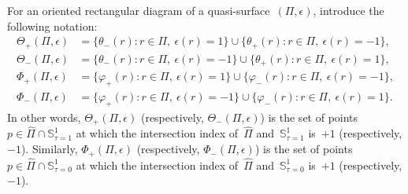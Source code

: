 \documentclass{amsart}
\theoremstyle{theorem}
\theoremstyle{remark}
\theoremstyle{definition}
\numberwithin{equation}{section}
\numberwithin{figure}{section}
\begin{document}
For an oriented rectangular diagram of a quasi-surface~$(\Pi,\epsilon)$, introduce the following notation:
$$\begin{aligned}
\Theta_+(\Pi,\epsilon)&=\{\theta_-(r):r\in\Pi,\ \epsilon(r)=1\}\cup
\{\theta_+(r):r\in\Pi,\ \epsilon(r)=-1\},\\
\Theta_-(\Pi,\epsilon)&=\{\theta_-(r):r\in\Pi,\ \epsilon(r)=-1\}\cup
\{\theta_+(r):r\in\Pi,\ \epsilon(r)=1\},\\
\Phi_+(\Pi,\epsilon)&=\{\varphi_+(r):r\in\Pi,\ \epsilon(r)=1\}\cup
\{\varphi_-(r):r\in\Pi,\ \epsilon(r)=-1\},\\
\Phi_-(\Pi,\epsilon)&=\{\varphi_+(r):r\in\Pi,\ \epsilon(r)=-1\}\cup
\{\varphi_-(r):r\in\Pi,\ \epsilon(r)=1\}.
\end{aligned}$$
In other words, $\Theta_+(\Pi,\epsilon)$ (respectively, $\Theta_-(\Pi,\epsilon)$)
is the set of points~$p\in\widehat\Pi\cap\mathbb S^1_{\tau=1}$
at which the intersection index of~$\widehat\Pi$ and~$\mathbb S^1_{\tau=1}$ is~$+1$ (respectively, $-1$).
Similarly, $\Phi_+(\Pi,\epsilon)$ (respectively, $\Phi_-(\Pi,\epsilon)$)
is the set of points~$p\in\widehat\Pi\cap\mathbb S^1_{\tau=0}$
at which the intersection index of~$\widehat\Pi$ and~$\mathbb S^1_{\tau=0}$ is~$+1$ (respectively, $-1$).
\end{document}
